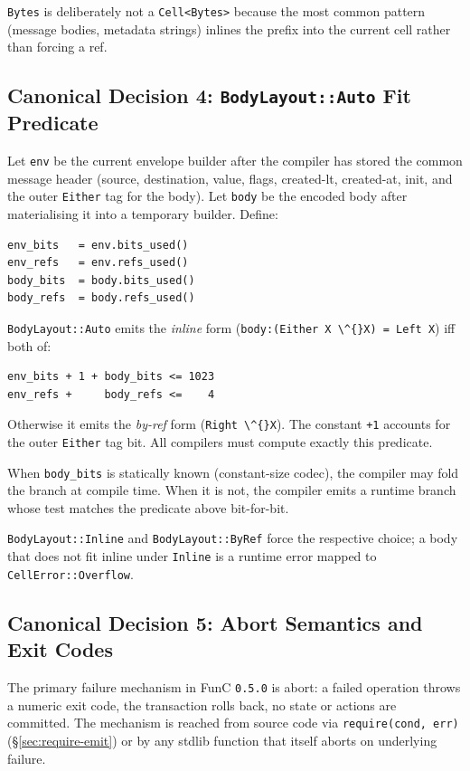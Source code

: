\documentclass[12pt,oneside]{article}
\begin{document}
\verb|Bytes| is deliberately not a \verb|Cell<Bytes>| because the most common
pattern (message bodies, metadata strings) inlines the prefix into the
current cell rather than forcing a ref.

\subsection{Canonical Decision 4: \texttt{BodyLayout::Auto} Fit Predicate}
\label{sec:cd-bodylayout}
Let \verb|env| be the current envelope builder after the compiler has stored
the common message header (source, destination, value, flags, created-lt,
created-at, init, and the outer \verb|Either| tag for the body). Let
\verb|body| be the encoded body after materialising it into a temporary
builder. Define:

\begin{verbatim}
env_bits   = env.bits_used()
env_refs   = env.refs_used()
body_bits  = body.bits_used()
body_refs  = body.refs_used()
\end{verbatim}

\verb|BodyLayout::Auto| emits the \emph{inline} form
(\verb|body:(Either X \^{}X) = Left X|) iff both of:

\begin{verbatim}
env_bits + 1 + body_bits <= 1023
env_refs +     body_refs <=    4
\end{verbatim}

Otherwise it emits the \emph{by-ref} form (\verb|Right \^{}X|). The constant
\verb|+1| accounts for the outer \verb|Either| tag bit. All compilers must
compute exactly this predicate.

When \verb|body_bits| is statically known (constant-size codec), the compiler
may fold the branch at compile time. When it is not, the compiler emits a
runtime branch whose test matches the predicate above bit-for-bit.

\verb|BodyLayout::Inline| and \verb|BodyLayout::ByRef| force the respective
choice; a body that does not fit inline under \verb|Inline| is a runtime
error mapped to \verb|CellError::Overflow|.

\subsection{Canonical Decision 5: Abort Semantics and Exit Codes}
\label{sec:cd-err-exit}
The primary failure mechanism in FunC \verb|0.5.0| is abort: a failed
operation throws a numeric exit code, the transaction rolls back, no
state or actions are committed. The mechanism is reached from source
code via \verb|require(cond, err)| (\S\ref{sec:require-emit}) or by
any stdlib function that itself aborts on underlying failure.
\end{document}
